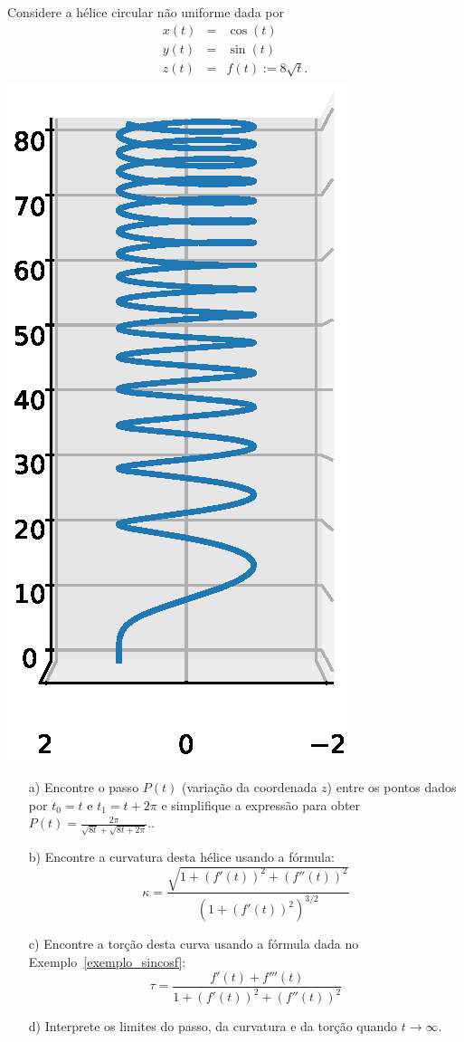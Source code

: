 \begin{exeresol}  Considere a hélice circular não uniforme dada por
  \begin{eqnarray*}
    x(t)&=&\cos(t)\\
    y(t)&=&\sin(t)\\
    z(t)&=&f(t):=8\sqrt{t}.\\
  \end{eqnarray*}
  \includegraphics[scale=.6]{./cap_curvas/figs/helice_sqrt_z}
  \begin{itemize}
    \item[a)] Encontre o passo $P(t)$ (variação da coordenada $z$) entre os pontos dados por $t_0=t$ e $t_1=t+2\pi$ e simplifique a expressão para obter $P(t)=\frac{2\pi}{\sqrt{8t} + \sqrt{8t+2\pi}}.$.
  \item[b)] Encontre  a curvatura desta hélice usando a fórmula:
  $$\kappa=\frac{\sqrt{1+\left(f'(t)\right)^2+\left(f''(t)\right)^2}}{\left({1+\left(f'(t)\right)^2}\right)^{3/2}}$$
    \item[c)] Encontre a torção desta curva usando a fórmula dada no Exemplo~\ref{exemplo_sincosf}:
    $$\tau=\frac{f'(t)+f'''(t)}{1+\left(f'(t)\right)^2+\left(f''(t)\right)^2}$$
    \item[d)] Interprete os limites do passo, da curvatura e da torção quando $t\to \infty$.
    \end{itemize}
  \end{exeresol}

